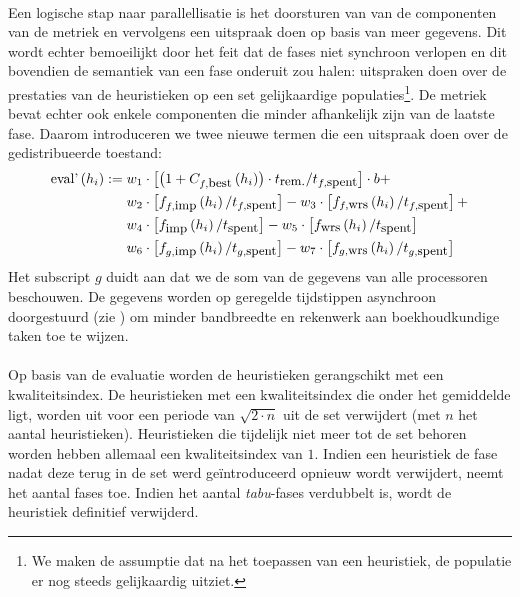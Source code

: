 \paragraph{}
Een logische stap naar parallellisatie is het doorsturen van van de componenten van de metriek en vervolgens een uitspraak doen op basis van meer gegevens. Dit wordt echter bemoeilijkt door het feit dat de fases niet synchroon verlopen en dit bovendien de semantiek van een fase onderuit zou halen: uitspraken doen over de prestaties van de heuristieken op een set gelijkaardige populaties\footnote{We maken de assumptie dat na het toepassen van een heuristiek, de populatie er nog steeds gelijkaardig uitziet.}. De metriek bevat echter ook enkele componenten die minder afhankelijk zijn van de laatste fase. Daarom introduceren we twee nieuwe termen die een uitspraak doen over de gedistribueerde toestand:
\begin{align*}
\mbox{eval'}\left(h_i\right):={}&w_1\cdot\left[\left(1+C_{f,\mbox{\small{best}}}\left(h_i\right)\right)\cdot t_{\mbox{\small{rem.}}}/t_{f,\mbox{\small{spent}}}\right]\cdot b+\\
&w_2\cdot\left[f_{f,\mbox{\small{imp}}}\left(h_i\right)/t_{f,\mbox{\small{spent}}}\right]-w_3\cdot\left[f_{f,\mbox{\small{wrs}}}\left(h_i\right)/t_{f,\mbox{\small{spent}}}\right]+\\
&w_4\cdot\left[f_{\mbox{\small{imp}}}\left(h_i\right)/t_{\mbox{\small{spent}}}\right]-w_5\cdot\left[f_{\mbox{\small{wrs}}}\left(h_i\right)/t_{\mbox{\small{spent}}}\right]\\
&w_6\cdot\left[f_{g,\mbox{\small{imp}}}\left(h_i\right)/t_{g,\mbox{\small{spent}}}\right]-w_7\cdot\left[f_{g,\mbox{\small{wrs}}}\left(h_i\right)/t_{g,\mbox{\small{spent}}}\right]
\end{align*}
Het subscript $g$ duidt aan dat we de som van de gegevens van alle processoren beschouwen. De gegevens worden op geregelde tijdstippen asynchroon doorgestuurd (zie ) om minder bandbreedte en rekenwerk aan boekhoudkundige taken toe te wijzen.

\paragraph{}
Op basis van de evaluatie worden de heuristieken gerangschikt met een kwaliteitsindex. De heuristieken met een kwaliteitsindex die onder het gemiddelde ligt, worden uit voor een periode van $\sqrt{2\cdot n}$ uit de set verwijdert (met $n$ het aantal heuristieken). Heuristieken die tijdelijk niet meer tot de set behoren worden hebben allemaal een kwaliteitsindex van $1$. Indien een heuristiek de fase nadat deze terug in de set werd ge\"introduceerd opnieuw wordt verwijdert, neemt het aantal fases toe. Indien het aantal \emph{tabu}-fases verdubbelt is, wordt de heuristiek definitief verwijderd.